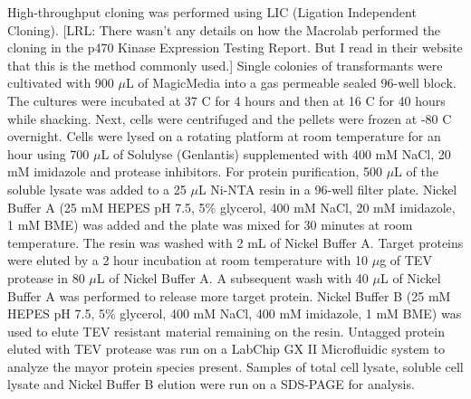 \documentclass[aps,pre,twocolumn,nofootinbib,superscriptaddress,linenumbers]{revtex4-1}
\begin{document}
High-throughput cloning was performed using LIC (Ligation Independent Cloning). {\color{blue}[LRL: There wasn't any details on how the Macrolab performed the cloning in the p470 Kinase Expression Testing Report. But I read in their website that this is the method commonly used.]}
Single colonies of transformants were cultivated with 900 $\mu$L of MagicMedia into a gas permeable sealed 96-well block. 
The cultures were incubated at 37 C for 4 hours and then at 16 C for 40 hours while shacking. 
Next, cells were centrifuged and the pellets were frozen at -80 C overnight. 
Cells were lysed on a rotating platform at room temperature for an hour using 700 $\mu$L of Solulyse (Genlantis) supplemented with 400 mM NaCl, 20 mM imidazole and protease inhibitors. 
For protein purification, 500 $\mu$L of the soluble lysate was added to a 25 $\mu$L Ni-NTA resin in a 96-well filter plate. 
Nickel Buffer A (25 mM HEPES pH 7.5, 5\% glycerol, 400 mM NaCl, 20 mM imidazole, 1 mM BME) was added and the plate was mixed for 30 minutes at room temperature. 
The resin was washed with 2 mL of Nickel Buffer A. 
Target proteins were eluted by a 2 hour incubation at room temperature with 10 $\mu$g of TEV protease in 80 $\mu$L of Nickel Buffer A.
A subsequent wash with 40 $\mu$L of Nickel Buffer A was performed to release more target protein. 
Nickel Buffer B (25 mM HEPES pH 7.5, 5\% glycerol, 400 mM NaCl, 400 mM imidazole, 1 mM BME) was used to elute TEV resistant material remaining on the resin.
Untagged protein eluted with TEV protease was run on a LabChip GX II Microfluidic system to analyze the mayor protein species present. 
Samples of total cell lysate, soluble cell lysate and Nickel Buffer B elution were run on a SDS-PAGE for analysis. 

%  
% 
\end{document}
